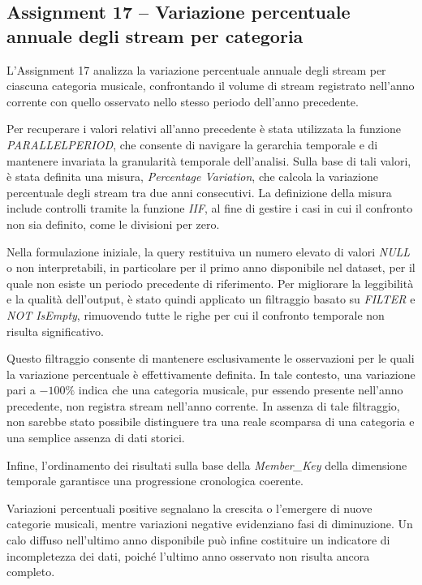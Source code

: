 \subsection*{Assignment 17 -- Variazione percentuale annuale degli stream per categoria}

L’Assignment 17 analizza la variazione percentuale annuale degli stream per
ciascuna categoria musicale, confrontando il volume di stream registrato
nell’anno corrente con quello osservato nello stesso periodo dell’anno
precedente.

Per recuperare i valori relativi all’anno precedente è stata utilizzata la
funzione \textit{PARALLELPERIOD}, che consente di navigare la gerarchia temporale e
di mantenere invariata la granularità temporale dell’analisi. Sulla base di tali
valori, è stata definita una misura, \textit{Percentage Variation}, che calcola la
variazione percentuale degli stream tra due anni consecutivi. La definizione
della misura include controlli tramite la funzione \textit{IIF}, al fine di
gestire i casi in cui il confronto non sia definito, come le
divisioni per zero.

Nella formulazione iniziale, la query restituiva un numero elevato di valori
\textit{NULL} o non interpretabili, in particolare per il primo anno disponibile
nel dataset, per il quale non esiste un periodo precedente di riferimento. Per
migliorare la leggibilità e la qualità dell’output, è stato quindi applicato un
filtraggio basato su \textit{FILTER} e \textit{NOT IsEmpty}, rimuovendo tutte le
righe per cui il confronto temporale non risulta significativo.

Questo filtraggio consente di mantenere esclusivamente le osservazioni per le
quali la variazione percentuale è effettivamente definita. In tale contesto, una
variazione pari a $-100\%$ indica che una categoria musicale, pur essendo presente
nell’anno precedente, non registra stream nell’anno corrente. In assenza di tale
filtraggio, non sarebbe stato possibile distinguere tra una reale scomparsa di
una categoria e una semplice assenza di dati storici.

Infine, l’ordinamento dei risultati sulla base della \textit{Member\_Key} della
dimensione temporale garantisce una progressione cronologica coerente.

Variazioni percentuali positive segnalano la crescita o l’emergere di
nuove categorie musicali, mentre variazioni negative evidenziano fasi di
diminuzione. Un calo diffuso nell’ultimo anno disponibile può infine costituire
un indicatore di incompletezza dei dati, poiché l’ultimo anno osservato non
risulta ancora completo.
